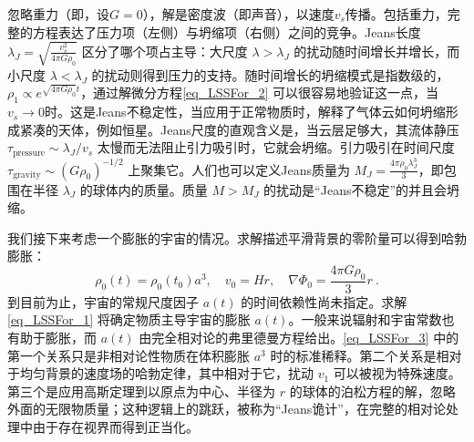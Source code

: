 忽略重力（即，设$G=0$），解是密度波（即声音），以速度$v_s$传播。包括重力，完整的方程表达了压力项（左侧）与坍缩项（右侧）之间的竞争。Jeans长度 \( \lambda_J = \sqrt{\frac{v^2_s}{4\pi G \rho_0}} \) 区分了哪个项占主导：大尺度 \( \lambda > \lambda_J \) 的扰动随时间增长并增长，而小尺度 \( \lambda < \lambda_J \) 的扰动则得到压力的支持。随时间增长的坍缩模式是指数级的，\( \rho_1 \propto e^{\sqrt{4\pi G \rho_0} t} \)，通过解微分方程\autoref{eq_LSSFor_2} 可以很容易地验证这一点，当$v_s \rightarrow 0$时。这是Jeans不稳定性，当应用于正常物质时，解释了气体云如何坍缩形成紧凑的天体，例如恒星。Jeans尺度的直观含义是，当云层足够大，其流体静压 \( \tau_{\text{pressure}} \sim \lambda_J / v_s \) 太慢而无法阻止引力吸引时，它就会坍缩。引力吸引在时间尺度 \( \tau_{\text{gravity}} \sim (G\rho_0)^{-1/2} \) 上聚集它。人们也可以定义Jeans质量为 \( M_J = \frac{4\pi \rho_0 \lambda^3_J}{3} \)，即包围在半径 \( \lambda_J \) 的球体内的质量。质量 \( M > M_J \) 的扰动是“Jeans不稳定”的并且会坍缩。

我们接下来考虑一个膨胀的宇宙的情况。求解描述平滑背景的零阶量可以得到哈勃膨胀：
\begin{equation}\label{eq_LSSFor_3}\rho_0(t) = \rho_0(t_0) a^3, \quad v_0 = Hr, \quad \nabla \Phi_0 = \frac{4\pi G \rho_0}{3} r~. \end{equation}
到目前为止，宇宙的常规尺度因子 \( a(t) \) 的时间依赖性尚未指定。求解\autoref{eq_LSSFor_1} 将确定物质主导宇宙的膨胀 \( a(t) \)。一般来说辐射和宇宙常数也有助于膨胀，而 \( a(t) \) 由完全相对论的弗里德曼方程给出。\autoref{eq_LSSFor_3} 中的第一个关系只是非相对论性物质在体积膨胀 \( a^3 \) 时的标准稀释。第二个关系是相对于均匀背景的速度场的哈勃定律，其中相对于它，扰动 \( v_1 \) 可以被视为特殊速度。第三个是应用高斯定理到以原点为中心、半径为 \( r \) 的球体的泊松方程的解，忽略外面的无限物质量；这种逻辑上的跳跃，被称为“Jeans诡计”，在完整的相对论处理中由于存在视界而得到正当化。

